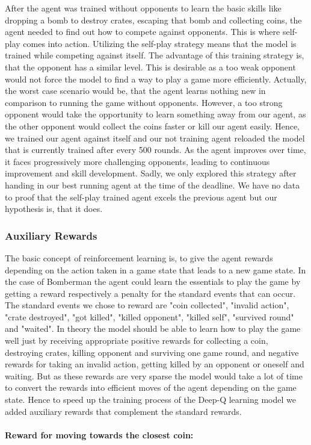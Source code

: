 After the agent was trained without opponents to learn the basic skills like dropping a bomb to destroy crates, escaping that bomb and collecting coins, the agent needed to find out how to compete against opponents. This is where self-play comes into action. Utilizing the self-play strategy means that the model is trained while competing against itself. The advantage of this training strategy is, that the opponent has a similar level. This is desirable as a too weak opponent would not force the model to find a way to play a game more efficiently. Actually, the worst case scenario would be, that the agent learns nothing new in comparison to running the game without opponents. However, a too strong opponent would take the opportunity to learn something away from our agent, as the other opponent would collect the coins faster or kill our agent easily. Hence, we trained our agent against itself and our not training agent reloaded the model that is currently trained after every 500 rounds. As the agent improves over time, it faces progressively more challenging opponents, leading to continuous improvement and skill development. \cite{selfplay} Sadly, we only explored this strategy after handing in our best running agent at the time of the deadline. We have no data to proof that the self-play trained agent excels the previous agent but our hypothesis is, that it does.

\subsubsection{Auxiliary Rewards} \label{sec:rewards}

The basic concept of reinforcement learning is, to give the agent rewards depending on the action taken in a game state that leads to a new game state. In the case of Bomberman the agent could learn the essentials to play the game by getting a reward respectively a penalty for the standard events that can occur. The standard events we chose to reward are "coin collected", "invalid action", "crate destroyed", "got killed",  "killed opponent", "killed self", "survived round" and "waited". In theory the model should be able to learn how to play the game well just by receiving appropriate positive rewards for collecting a coin, destroying crates, killing opponent and surviving one game round, and negative rewards for taking an invalid action, getting killed by an opponent or oneself and waiting. But as these rewards are very sparse the model would take a lot of time to convert the rewards into efficient moves of the agent depending on the game state. Hence to speed up the training process of the Deep-Q learning model we added auxiliary rewards that complement the standard rewards.
\\ \\
\textbf{Reward for moving towards the closest coin:} \\

